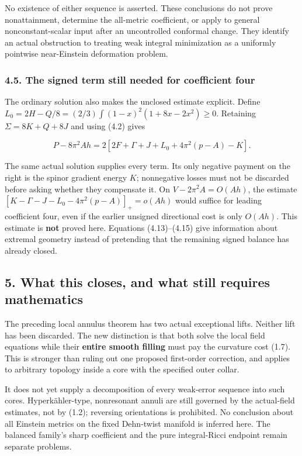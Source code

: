 \documentclass[
  10pt,
]{article}
\begin{document}
No existence of either sequence is asserted. These conclusions do not
prove nonattainment, determine the all-metric coefficient, or apply to
general nonconstant-scalar input after an uncontrolled conformal change.
They identify an actual obstruction to treating weak integral
minimization as a uniformly pointwise near-Einstein deformation problem.

\hypertarget{the-signed-term-still-needed-for-coefficient-four}{%
\subsubsection{4.5. The signed term still needed for coefficient
four}\label{the-signed-term-still-needed-for-coefficient-four}}

The ordinary solution also makes the unclosed estimate explicit. Define
\(L_0=2H-Q/8=(2/3)\int(1-x)^2(1+8x-2x^2)\ge0\). Retaining
\(\Sigma=8K+Q+8J\) and using (4.2) gives

\[
 \boxed{P-8\pi^2Ah
        =2[2F+\Gamma+J+L_0+4\pi^2(p-A)-K].}          \tag{4.16}
\]

The same actual solution supplies every term. Its only negative payment
on the right is the spinor gradient energy \(K\); nonnegative losses
must not be discarded before asking whether they compensate it. On
\(V-2\pi^2A=O(Ah)\), the estimate
\([K-\Gamma-J-L_0-4\pi^2(p-A)]_+=o(Ah)\) would suffice for leading
coefficient four, even if the earlier unsigned directional cost is only
\(O(Ah)\). This estimate is \textbf{not} proved here. Equations
(4.13)--(4.15) give information about extremal geometry instead of
pretending that the remaining signed balance has already closed.

\hypertarget{what-this-closes-and-what-still-requires-mathematics}{%
\subsection{5. What this closes, and what still requires
mathematics}\label{what-this-closes-and-what-still-requires-mathematics}}

The preceding local annulus theorem has two actual exceptional lifts.
Neither lift has been discarded. The new distinction is that both solve
the local field equations while their \textbf{entire smooth filling}
must pay the curvature cost (1.7). This is stronger than ruling out one
proposed first-order correction, and applies to arbitrary topology
inside a core with the specified outer collar.

It does not yet supply a decomposition of every weak-error sequence into
such cores. Hyperkähler-type, nonresonant annuli are still governed by
the actual-field estimates, not by (1.2); reversing orientations is
prohibited. No conclusion about all Einstein metrics on the fixed
Dehn-twist manifold is inferred here. The balanced family's sharp
coefficient and the pure integral-Ricci endpoint remain separate
problems.
\end{document}
